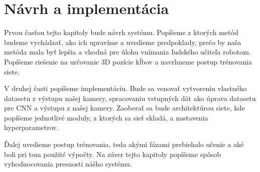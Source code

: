 \chapter{Návrh a implementácia}\label{chap:proposal_and_implementation}
Prvou časťou tejto kapitoly bude návrh systému. Popíšeme z ktorých metód budeme vychádzať, ako ich upravíme a uvedieme predpoklady, prečo by naša metóda mala byť lepšia a vhodná pre úlohu vnímania ľudského učiteľa robotom. Popíšeme riešenie na určovanie 3D pozície kĺbov a navrhneme postup trénovania siete.

V druhej časti popíšeme implementáciu. Bude sa venovať vytvoreniu vlastného datasetu z výstupu našej kamery, spracovaniu vstupných dát ako úprava datasetu pre CNN a výstupu z našej kamery. Zaoberať sa bude architektúrou siete, kde popíšeme jednotlivé moduly, z ktorých sa sieť skladá, a nastavenia hyperparametrov.

Ďalej uvedieme postup trénovania, teda akými fázami prebiehalo učenie a aké boli pri tom použité výpočty. Na záver tejto kapitoly popíšeme spôsob vyhodnocovania presnosti nášho systému.


